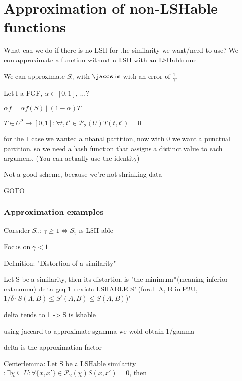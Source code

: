	
	
	
\section{Approximation of non-LSHable functions}

	What can we do if there is no LSH for the similarity we want/need to use? We can approximate a function without a LSH with an LSHable one.
	
	\ex We can approximate $S_\gamma$ with $\jaccsim$ with an error of $\frac{1}{\gamma}$.
	
	Let f a PGF, $\alpha \in [0, 1]$, ...?
	
	$\alpha f = \alpha f(S)\ |\ (1 - \alpha)T$
	
	$T \in U^2 \to [0, 1] : \forall {t, t'} \in \mathcal{P}_2(U) T(t, t') = 0$
	
	for the 1 case we wanted a nbanal partition, now with 0 we want a punctual partition, so we need a hash function that assigns a distinct value to each argument. (You can actually use the identity)
	
	Not a good scheme, because we're not shrinking data
	
	GOTO %
	
\subsubsection{Approximation examples}
	
	Consider $S_\gamma$: $\gamma \geq 1 \Leftrightarrow S_\gamma$ is LSH-able
	
	Focus on $\gamma < 1$
	
	Definition: "Distortion of a similarity"
	
	Let S be a similarity, then its distortion is "the minimum*(meaning inferior extremum) delta geq 1 : exists LSHABLE S' (forall {A, B} in P2U, $1/\delta \cdot S(A, B) \leq S'(A, B) \leq S(A, B)$)"
	
	delta tends to 1 -> S is lshable
	
	using jaccard to approximate sgamma we wold obtain 1/gamma
	
	delta is the approximation factor
	
	
	Centerlemma: Let S be a LSHable similarity $ : \exists \chi \subseteq U : \forall \{x, x'\} \in \mathcal{P}_2(\chi) S(x, x')=0$, then
	
